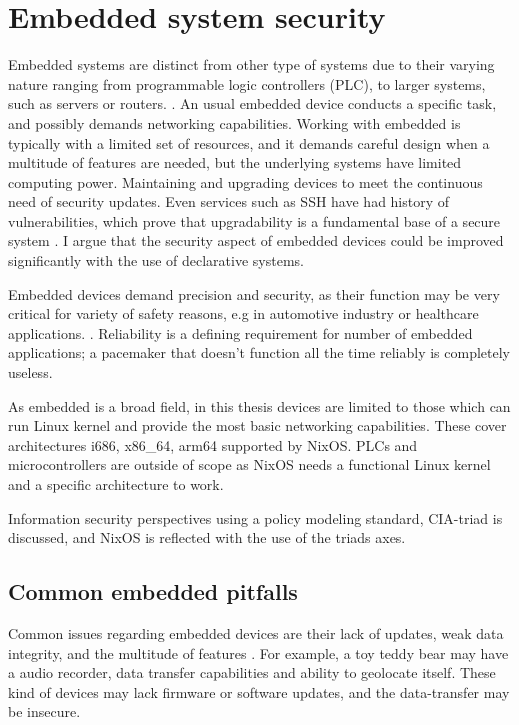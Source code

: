\chapter{Embedded system security}

Embedded systems are distinct from other type of systems due to their varying nature ranging from programmable logic controllers (PLC), to larger systems, such as servers or routers. \cite{fysarakis2014embedded}. An usual embedded device conducts a specific task, and possibly demands networking capabilities. Working with embedded is typically with a limited set of resources, and it demands careful design when a multitude of features are needed, but the underlying systems have limited computing power. Maintaining and upgrading devices to meet the continuous need of security updates. Even services such as SSH have had history of vulnerabilities, which prove that upgradability is a fundamental base of a secure system \cite{secopsolutionHistorySecOps}. I argue that the security aspect of embedded devices could be improved significantly with the use of declarative systems.

Embedded devices demand precision and security, as their function may be very critical for variety of safety reasons, e.g in automotive industry or healthcare applications. \cite{turab2019secure} \cite{fysarakis2014embedded}. Reliability is a defining requirement for number of embedded applications; a pacemaker that doesn't function all the time reliably is completely useless. %

As embedded is a broad field, in this thesis devices are limited to those which can run Linux kernel and provide the most basic networking capabilities. These cover architectures i686, x86\_64, arm64 supported by NixOS. PLCs and microcontrollers are outside of scope as NixOS needs a functional Linux kernel and a specific architecture to work. 

Information security perspectives using a policy modeling standard, CIA-triad is discussed, and NixOS is reflected with the use of the triads axes.

\section{Common embedded pitfalls}

Common issues regarding embedded devices are their lack of updates, weak data integrity, and the multitude of features \cite{kemmerer2003cybersecurity} \cite{fysarakis2014embedded}. For example, a toy teddy bear may have a audio recorder, data transfer capabilities and ability to geolocate itself. These kind of devices may lack firmware or software updates, and the data-transfer may be insecure.

